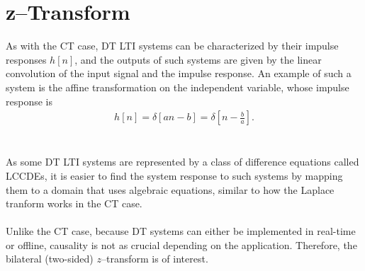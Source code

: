\documentclass{report}
\begin{document}
\setcounter{chapter}{3}
\setcounter{page}{30}
\chapter{z--Transform}
As with the CT case, DT LTI systems can be characterized by their impulse responses $h[n]$, and 
the outputs of such systems are given by the linear convolution of the input signal and the impulse response. 
An example of such a system is the affine transformation on the independent variable, whose impulse response is 
\begin{align}
    h[n]=\delta[an-b]=\delta\left[n-\frac{b}{a}\right].
\end{align}
\\ \\
As some DT LTI systems are represented by a class of difference equations called LCCDEs, it is easier to find 
the system response to such systems by mapping them to a domain that uses algebraic equations, similar to how the 
Laplace tranform works in the CT case.
\\ \\
Unlike the CT case, because DT systems can either be implemented in real-time or offline, causality is not as 
crucial depending on the application. Therefore, the bilateral (two-sided) $z$--transform is of interest.
\end{document}
